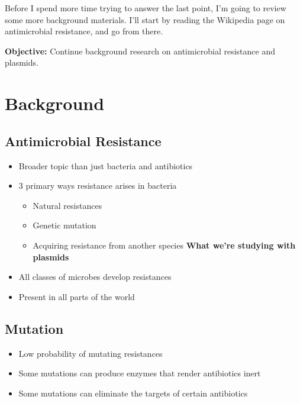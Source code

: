 \documentclass[oneside]{labbook}
\newcommand{\obj}[1]{\textbf{Objective:} #1\\}
\begin{document}
Before I spend more time trying to answer the last point, I'm going to review some
more background materials. I'll start by reading the Wikipedia page on antimicrobial
resistance, and go from there.


\obj{Continue background research on antimicrobial resistance and plasmids.}

\section{Background}
\subsection*{Antimicrobial Resistance}

\begin {itemize}[label={--}]
\item Broader topic than just bacteria and antibiotics
\item 3 primary ways resistance arises in bacteria
\begin{itemize}
  \item Natural resistances
  \item Genetic mutation
  \item Acquiring resistance from another species \textbf{What we're studying with plasmids}
\end{itemize}
\item All classes of microbes develop resistances
\item Present in all parts of the world
\end{itemize}


\subsection*{Mutation}
\begin{itemize}
  \item Low probability of mutating resistances
  \item Some mutations can produce enzymes that render antibiotics inert
  \item Some mutations can eliminate the targets of certain antibiotics
\end{itemize}
\end{document}
